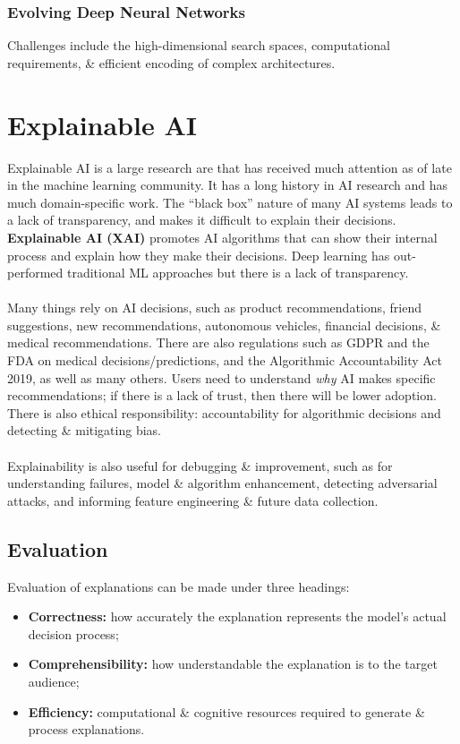 \documentclass[a4paper,11pt]{article}
\begin{document}
\subsubsection{Evolving Deep Neural Networks}
Challenges include the high-dimensional search spaces, computational requirements, \& efficient encoding of complex architectures.

\section{Explainable AI}
Explainable AI is a large research are that has received much attention as of late in the machine learning community.
It has a long history in AI research and has much domain-specific work.
The ``black box'' nature of many AI systems leads to a lack of transparency, and makes it difficult to explain their decisions.
\textbf{Explainable AI (XAI)} promotes AI algorithms that can show their internal process and explain how they make their decisions.
Deep learning has out-performed traditional ML approaches but there is a lack of transparency.
\\\\
Many things rely on AI decisions, such as product recommendations, friend suggestions, new recommendations, autonomous vehicles, financial decisions, \& medical recommendations.
There are also regulations such as GDPR and the FDA on medical decisions/predictions, and the Algorithmic Accountability Act 2019, as well as many others.
Users need to understand \textit{why} AI makes specific recommendations;
if there is a lack of trust, then there will be lower adoption.
There is also ethical responsibility: accountability for algorithmic decisions and detecting \& mitigating bias.
\\\\
Explainability is also useful for debugging \& improvement, such as for understanding failures, model \& algorithm enhancement, detecting adversarial attacks, and informing feature engineering \& future data collection.

\subsection{Evaluation}
Evaluation of explanations can be made under three headings:
\begin{itemize}
    \item   \textbf{Correctness:} how accurately the explanation represents the model's actual decision process;
    \item   \textbf{Comprehensibility:} how understandable the explanation is to the target audience;
    \item   \textbf{Efficiency:} computational \& cognitive resources required to generate \& process explanations.
\end{itemize}
\end{document}
